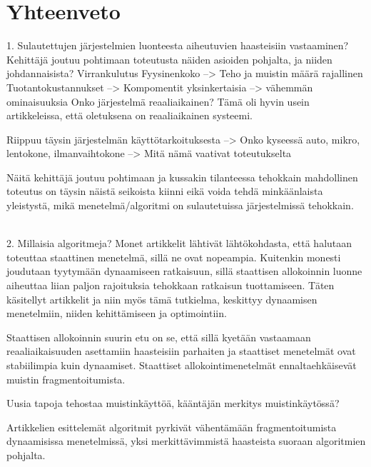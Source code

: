 \chapter{Yhteenveto} \label{Yhteenveto}


1. Sulautettujen järjestelmien luonteesta aiheutuvien haasteisiin vastaaminen?
    Kehittäjä joutuu pohtimaan toteutusta näiden asioiden pohjalta, ja niiden johdannaisista?
        Virrankulutus
        Fyysinenkoko --> Teho ja muistin määrä rajallinen
        Tuotantokustannukset --> Kompomentit yksinkertaisia --> vähemmän ominaisuuksia
    Onko järjestelmä reaaliaikainen? Tämä oli hyvin usein artikkeleissa, että oletuksena on reaaliaikainen systeemi.

    Riippuu täysin järjestelmän käyttötarkoituksesta --> Onko kyseessä auto, mikro, lentokone, ilmanvaihtokone --> Mitä nämä vaativat toteutukselta

    Näitä kehittäjä joutuu pohtimaan ja kussakin tilanteessa tehokkain mahdollinen toteutus on täysin näistä seikoista kiinni eikä voida tehdä minkäänlaista yleistystä, mikä menetelmä/algoritmi on sulautetuissa järjestelmissä tehokkain.


~\\

2. Millaisia algoritmeja?
    Monet artikkelit lähtivät lähtökohdasta, että halutaan toteuttaa staattinen menetelmä, sillä ne ovat nopeampia. Kuitenkin monesti joudutaan tyytymään dynaamiseen ratkaisuun, sillä staattisen allokoinnin luonne aiheuttaa liian paljon rajoituksia tehokkaan ratkaisun tuottamiseen. Täten käsitellyt artikkelit ja niin myös tämä tutkielma, keskittyy dynaamisen menetelmiin, niiden kehittämiseen ja optimointiin.

    Staattisen allokoinnin suurin etu on se, että sillä kyetään vastaamaan reaaliaikaisuuden asettamiin haasteisiin parhaiten ja staattiset menetelmät ovat stabiilimpia kuin dynaamiset. Staattiset allokointimenetelmät ennaltaehkäisevät muistin fragmentoitumista.\cite{daroemmfera@2006}

    Uusia tapoja tehostaa muistinkäyttöä, kääntäjän merkitys muistinkäytössä?

    Artikkelien esittelemät algoritmit pyrkivät vähentämään fragmentoitumista dynaamisissa menetelmissä, yksi merkittävimmistä haasteista suoraan algoritmien pohjalta.
